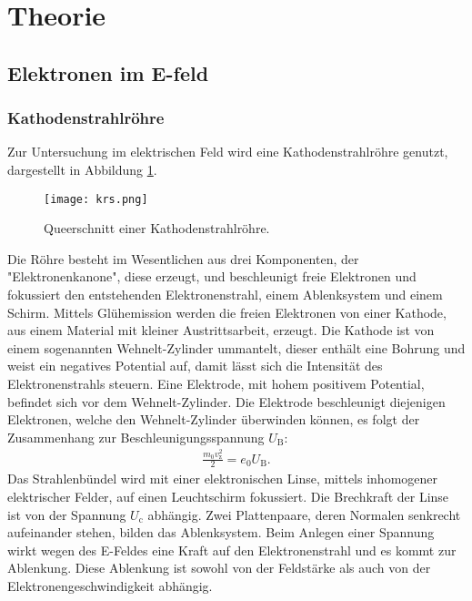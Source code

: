 \section{Theorie}
\label{sec:Theorie}
\subsection{Elektronen im E-feld}
\subsubsection{Kathodenstrahlröhre}
Zur Untersuchung im elektrischen Feld wird eine Kathodenstrahlröhre genutzt,
dargestellt in Abbildung \ref{fig:krs}.
\begin{figure}
\centering
\texttt{[image: krs.png]}
\caption{Queerschnitt einer Kathodenstrahlröhre.\cite{sample1}}
\label{fig:krs}
\end{figure}
Die Röhre besteht im Wesentlichen aus drei Komponenten, der "Elektronenkanone",
diese erzeugt, und beschleunigt freie Elektronen und
fokussiert den entstehenden Elektronenstrahl, einem Ablenksystem und einem Schirm.
Mittels Glühemission werden die freien Elektronen von einer Kathode, aus
einem Material mit kleiner Austrittsarbeit, erzeugt.
Die Kathode ist von einem sogenannten Wehnelt-Zylinder ummantelt, dieser enthält
eine Bohrung und weist ein negatives Potential auf, damit lässt sich die
Intensität des Elektronenstrahls steuern.
Eine Elektrode, mit hohem positivem Potential, befindet sich
vor dem Wehnelt-Zylinder. Die Elektrode beschleunigt diejenigen Elektronen,
welche den Wehnelt-Zylinder überwinden können, es folgt der Zusammenhang zur Beschleunigungsspannung $U_\mathrm{B}$:
\begin{align}
\frac{m_\mathrm{0}v_\mathrm{z}^{2}}{2}=e_\mathrm{0}U_\mathrm{B}\label{eqn:beschleunigung}.
\end{align}
Das Strahlenbündel wird mit einer elektronischen Linse, mittels
inhomogener elektrischer Felder, auf einen Leuchtschirm fokussiert.
Die Brechkraft der Linse ist von der Spannung $U_\mathrm{c}$ abhängig.
Zwei Plattenpaare, deren Normalen senkrecht aufeinander stehen, bilden
das Ablenksystem. Beim Anlegen einer Spannung wirkt wegen des E-Feldes
eine Kraft auf den Elektronenstrahl und es kommt zur Ablenkung.
Diese Ablenkung ist sowohl von der Feldstärke als auch von der
Elektronengeschwindigkeit abhängig.

